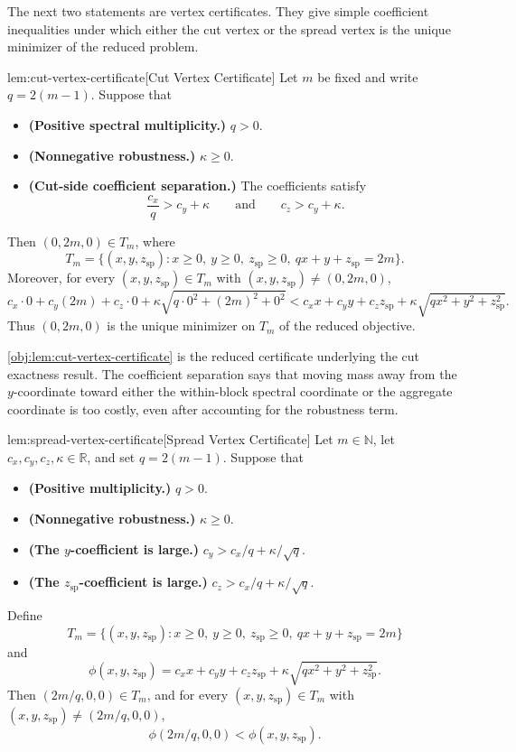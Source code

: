 The next two statements are vertex certificates. They give simple coefficient inequalities under which either the cut vertex or the spread vertex is the unique minimizer of the reduced problem.

\begin{lemmav}{lem:cut-vertex-certificate}[Cut Vertex Certificate]
Let \(m\) be fixed and write \(q=2(m-1)\). Suppose that
\begin{itemize}
\item \textbf{(Positive spectral multiplicity.)} \(q>0\).
\item \textbf{(Nonnegative robustness.)} \(\kappa\ge 0\).
\item \textbf{(Cut-side coefficient separation.)} The coefficients satisfy
\[
\frac{c_x}{q}>c_y+\kappa
\qquad\text{and}\qquad
c_z>c_y+\kappa .
\]
\end{itemize}
Then \((0,2m,0)\in T_m\), where
\[
T_m=\{(x,y,z_{\mathrm{sp}}): x\ge 0,\ y\ge 0,\ z_{\mathrm{sp}}\ge 0,\ qx+y+z_{\mathrm{sp}}=2m\}.
\]
Moreover, for every \((x,y,z_{\mathrm{sp}})\in T_m\) with
\((x,y,z_{\mathrm{sp}})\neq (0,2m,0)\),
\[
c_x\cdot 0+c_y(2m)+c_z\cdot 0
+\kappa\sqrt{q\cdot 0^2+(2m)^2+0^2}
<
c_xx+c_yy+c_zz_{\mathrm{sp}}
+\kappa\sqrt{qx^2+y^2+z_{\mathrm{sp}}^2}.
\]
Thus \((0,2m,0)\) is the unique minimizer on \(T_m\) of the reduced objective.
\end{lemmav}

\cref{obj:lem:cut-vertex-certificate} is the reduced certificate underlying the cut exactness result. The coefficient separation says that moving mass away from the \(y\)-coordinate toward either the within-block spectral coordinate or the aggregate coordinate is too costly, even after accounting for the robustness term.

\begin{lemmav}{lem:spread-vertex-certificate}[Spread Vertex Certificate]
Let \(m\in\mathbb N\), let \(c_x,c_y,c_z,\kappa\in\mathbb R\), and set \(q=2(m-1)\). Suppose that
\begin{itemize}
\item \textbf{(Positive multiplicity.)} \(q>0\).
\item \textbf{(Nonnegative robustness.)} \(\kappa\ge 0\).
\item \textbf{(The \(y\)-coefficient is large.)} \(c_y>c_x/q+\kappa/\sqrt q\).
\item \textbf{(The \(z_{\mathrm{sp}}\)-coefficient is large.)} \(c_z>c_x/q+\kappa/\sqrt q\).
\end{itemize}
Define
\[
T_m=\{(x,y,z_{\mathrm{sp}}):x\ge0,\ y\ge0,\ z_{\mathrm{sp}}\ge0,\ qx+y+z_{\mathrm{sp}}=2m\}
\]
and
\[
\phi(x,y,z_{\mathrm{sp}})
=
c_xx+c_yy+c_zz_{\mathrm{sp}}
+\kappa\sqrt{qx^2+y^2+z_{\mathrm{sp}}^2}.
\]
Then \((2m/q,0,0)\in T_m\), and for every \((x,y,z_{\mathrm{sp}})\in T_m\) with
\((x,y,z_{\mathrm{sp}})\neq (2m/q,0,0)\),
\[
\phi(2m/q,0,0)<\phi(x,y,z_{\mathrm{sp}}).
\]
\end{lemmav}

